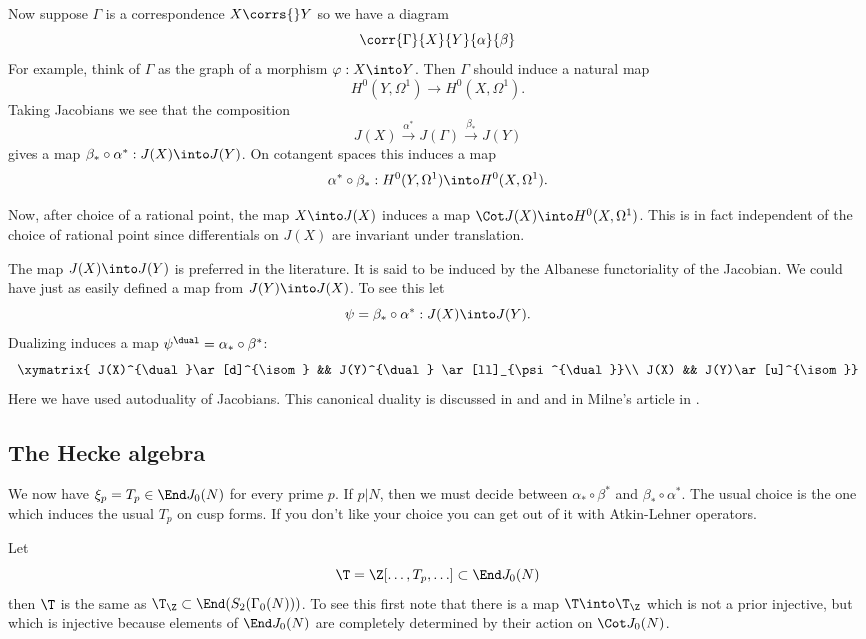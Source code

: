 \documentclass{report}
\begin{document}
Now suppose $\Gamma$ is a correspondence $X\corrs{}Y$ so we
have a diagram
$$\corr{\Gamma}{X}{Y}{\alpha}{\beta}$$
For example, think of $\Gamma$ as the graph of a morphism
$\varphi:X\into Y$. Then $\Gamma$ should induce a natural map
$$H^0(Y,\Omega^1)\longrightarrow H^0(X,\Omega^1).$$
Taking Jacobians we see that the composition
$$J(X)\xrightarrow{\alpha^{*}}J(\Gamma)\xrightarrow{\beta_{*}}J(Y)$$
gives a map $\beta_{*}\circ\alpha^{*}:J(X)\into J(Y)$. On cotangent spaces this
induces a map
$$\alpha^{*}\circ\beta_{*}:H^0(Y,\Omega^1)\into H^0(X,\Omega^1).$$

Now, after choice of a rational point, the map $X\into J(X)$
induces a map $\Cot J(X)\into H^0(X,\Omega^1)$. This is in fact
independent of the choice of rational point since differentials
on $J(X)$ are invariant under translation.

The map $J(X)\into J(Y)$ is preferred in the literature. It is
said to be induced by the Albanese functoriality of the Jacobian.
We could have just as easily defined a map from $J(Y)\into J(X)$.
To see this let
$$\psi=\beta_*\circ\alpha^{*}:J(X)\into J(Y).$$
Dualizing induces a map $\psi^{\dual}=\alpha_{*}\circ\beta^{*}$:
$$\xymatrix{
J(X)^{\dual}\ar[d]^{\isom}  &&
       J(Y)^{\dual} \ar[ll]_{\psi^{\dual}}\\
J(X) && J(Y)\ar[u]^{\isom}}
$$
Here we have used autoduality of Jacobians.
This canonical duality is discussed in \cite{mumford:geometric} and
\cite{mumford:abvars} and in Milne's article in \cite{schilling}.

\subsection{The Hecke algebra}
We now have $\xi_p=T_p\in\End J_0(N)$ for every prime $p$. If
$p|N$, then we must decide between $\alpha_{*}\circ\beta^{*}$ and
$\beta_{*}\circ\alpha^{*}$. The usual choice is the one which
induces the usual $T_p$ on cusp forms. If you don't like your
choice you can get out of it with Atkin-Lehner operators.

Let
     $$\T=\Z[\ldots,T_p,\ldots]\subset\End J_0(N)$$
then $\T$ is the same as $\T_{\Z}\subset\End(S_2(\Gamma_0(N)))$.
To see this first note that there is a map
$\T\into\T_{\Z}$ which is not a prior injective, but which is
injective because elements of $\End J_0(N)$ are completely
determined by their action on $\Cot J_0(N)$.
\end{document}
